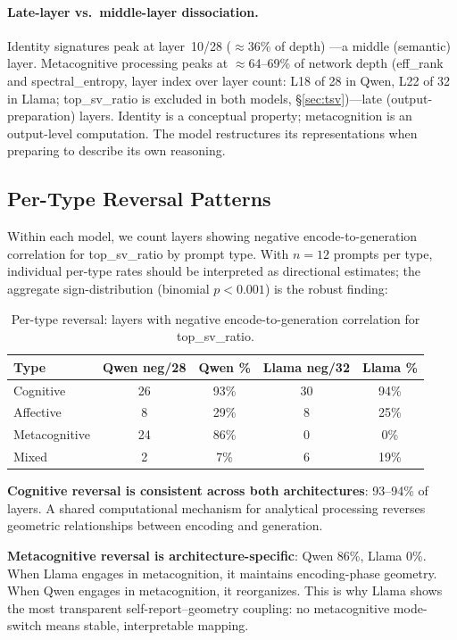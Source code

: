 \documentclass[11pt,a4paper]{article}
\begin{document}
\paragraph{Late-layer vs.\ middle-layer dissociation.} Identity signatures
peak at layer~10/28 ($\approx$36\% of depth) \citep{lyra2026campaign2}---a
middle (semantic) layer. Metacognitive processing peaks at $\approx$64--69\%
of network depth (eff\_rank and spectral\_entropy, layer index over layer
count: L18 of 28 in Qwen, L22 of 32 in Llama; top\_sv\_ratio is excluded in
both models, \S\ref{sec:tsv})---late (output-preparation) layers. Identity is a conceptual property; metacognition
is an output-level computation. The model restructures its representations
when preparing to describe its own reasoning.

\subsection{Per-Type Reversal Patterns}

Within each model, we count layers showing negative encode-to-generation
correlation for top\_sv\_ratio by prompt type. With $n = 12$ prompts per
type, individual per-type rates should be interpreted as directional
estimates; the aggregate sign-distribution (binomial $p < 0.001$) is the
robust finding:

\begin{table}[H]
\centering
\caption{Per-type reversal: layers with negative encode-to-generation correlation for top\_sv\_ratio.}
\label{tab:reversal_per_type}
\begin{tabular}{lcccc}
\toprule
\textbf{Type} & \textbf{Qwen neg/28} & \textbf{Qwen \%} & \textbf{Llama neg/32} & \textbf{Llama \%} \\
\midrule
Cognitive      & 26 & 93\% & 30 & 94\% \\
Affective      & 8  & 29\% & 8  & 25\% \\
Metacognitive  & 24 & 86\% & 0  & 0\%  \\
Mixed          & 2  & 7\%  & 6  & 19\% \\
\bottomrule
\end{tabular}
\end{table}

\textbf{Cognitive reversal is consistent across both architectures}: 93--94\% of layers. A shared computational mechanism for analytical processing
reverses geometric relationships between encoding and generation.

\textbf{Metacognitive reversal is architecture-specific}: Qwen 86\%, Llama
0\%. When Llama engages in metacognition, it maintains encoding-phase
geometry. When Qwen engages in metacognition, it reorganizes. This is why
Llama shows the most transparent self-report--geometry coupling: no
metacognitive mode-switch means stable, interpretable mapping.
\end{document}
